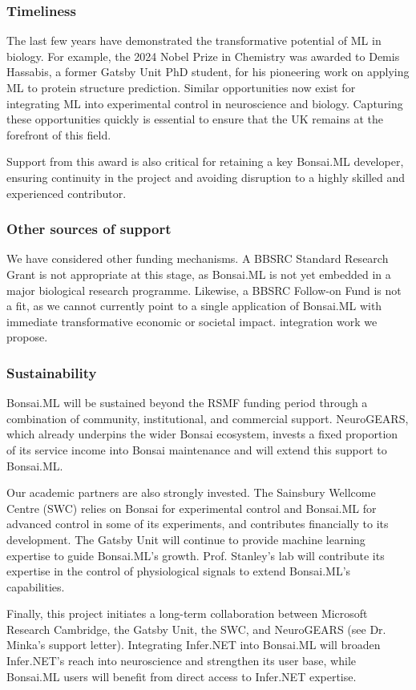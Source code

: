 \subsubsection*{Timeliness}

The last few years have demonstrated the transformative potential of ML in
biology. For example, the 2024 Nobel Prize in Chemistry was awarded to Demis
Hassabis, a former Gatsby Unit PhD student, for his pioneering work on applying
ML to protein structure prediction. Similar opportunities now exist for
integrating ML into experimental control in neuroscience and biology.
Capturing these opportunities quickly is essential to ensure that the UK
remains at the forefront of this field.

Support from this award is also critical for retaining a key Bonsai.ML
developer, ensuring continuity in the project and avoiding disruption to a
highly skilled and experienced contributor.

\subsubsection*{Other sources of support}

We have considered other funding mechanisms. A BBSRC Standard Research Grant is
not appropriate at this stage, as Bonsai.ML is not yet embedded in a major
biological research programme.
%
Likewise, a BBSRC Follow-on Fund is not a fit, as we cannot currently point to
a single application of Bonsai.ML with immediate transformative economic or
societal impact.
%
integration work we propose.

\subsubsection*{Sustainability}

Bonsai.ML will be sustained beyond the RSMF funding period through a
combination of community, institutional, and commercial support.
%
NeuroGEARS, which already underpins the wider Bonsai ecosystem, invests a fixed
proportion of its service income into Bonsai maintenance and will extend this
support to Bonsai.ML.

Our academic partners are also strongly invested.
%
The Sainsbury Wellcome Centre
(SWC) relies on Bonsai for experimental control and Bonsai.ML for advanced
control in some of its experiments, and contributes financially to its
development.
%
The Gatsby Unit will continue to provide machine learning
expertise to guide Bonsai.ML’s growth.
%
Prof. Stanley’s lab will contribute its expertise in the control of
physiological signals to extend Bonsai.ML’s capabilities.

Finally, this project initiates a long-term collaboration between Microsoft
Research Cambridge, the Gatsby Unit, the SWC, and NeuroGEARS (see Dr. Minka’s
support letter). Integrating Infer.NET into Bonsai.ML will broaden Infer.NET’s
reach into neuroscience and strengthen its user base, while Bonsai.ML users
will benefit from direct access to Infer.NET expertise.
